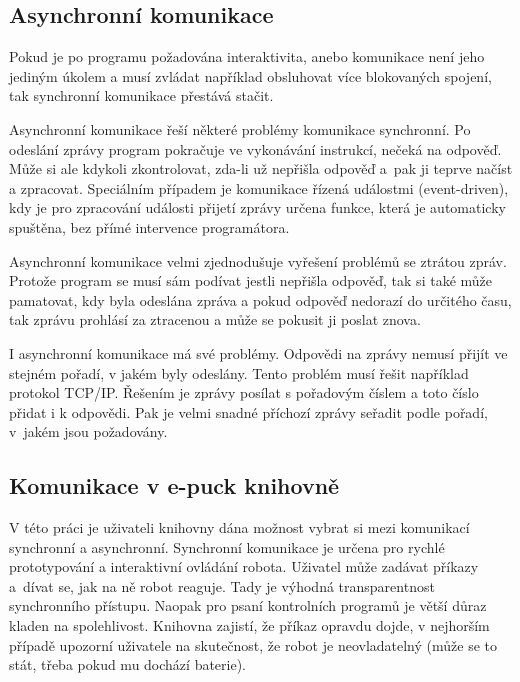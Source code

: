     \subsection{Asynchronní komunikace}
    \label{async}

    Pokud je po programu požadována interaktivita, anebo komunikace není jeho
    jediným úkolem a musí zvládat například obsluhovat více blokovaných
    spojení, tak synchronní komunikace přestává stačit.

    Asynchronní komunikace řeší některé problémy komunikace synchronní. Po
    odeslání zprávy program pokračuje ve vykonávání instrukcí, nečeká na
    odpověď. Může si ale kdykoli zkontrolovat, zda-li už nepřišla odpověď a~pak
    ji teprve načíst a zpracovat. Speciálním případem je komunikace řízená
    událostmi (event-driven), kdy je pro zpracování události přijetí zprávy
    určena funkce, která je automaticky spuštěna, bez přímé intervence
    programátora.

    Asynchronní komunikace velmi zjednodušuje vyřešení problémů se ztrátou
    zpráv. Protože program se musí sám podívat jestli nepřišla odpověď, tak si
    také může pamatovat, kdy byla odeslána zpráva a pokud odpověď nedorazí do
    určitého času, tak zprávu prohlásí za ztracenou a může se pokusit ji poslat
    znova.

    I asynchronní komunikace má své problémy. Odpovědi na zprávy nemusí přijít
    ve stejném pořadí, v jakém byly odeslány. Tento problém musí řešit
    například protokol TCP/IP. Řešením je zprávy posílat s pořadovým číslem a
    toto číslo přidat i k odpovědi. Pak je velmi snadné příchozí zprávy seřadit
    podle pořadí, v~jakém jsou požadovány.

    \subsection{Komunikace v e-puck knihovně}
    \label{comm-epuck}

    V této práci je uživateli knihovny dána možnost vybrat si mezi komunikací
    synchronní a asynchronní. Synchronní komunikace je určena pro rychlé
    prototypování a interaktivní ovládání robota. Uživatel může zadávat příkazy
    a~dívat se, jak na ně robot reaguje. Tady je výhodná transparentnost
    synchronního přístupu. Naopak pro psaní kontrolních programů je větší důraz
    kladen na spolehlivost. Knihovna zajistí, že příkaz opravdu dojde, v
    nejhorším případě upozorní uživatele na skutečnost, že robot je
    neovladatelný (může se to stát, třeba pokud mu dochází baterie).

